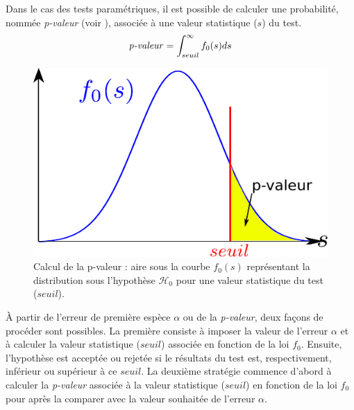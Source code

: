 Dans le cas des tests paramétriques, il est possible de calculer une probabilité, nommée \textit{p-valeur} (voir ), associée à une valeur statistique ($s$) du test.\\
\begin{equation}
    \text{\textit{p-valeur}} = \int_{seuil}^{\infty} f_0(s)ds
\end{equation}

\begin{figure}[ht]
    \centering
    \includegraphics[scale=0.6]{Images/calcul_p_valeur.pdf}
    \caption{\label{calcul_p_valeur}Calcul de la p-valeur : 
    aire sous la courbe $f_0(s)$ représentant la distribution sous l'hypothèse $\mathcal{H}_{0}$ pour une valeur statistique du test ($seuil$).}
\end{figure}

À partir de l'erreur de première espèce $\alpha$ ou de la \textit{p-valeur}, deux façons de procéder sont possibles.
La première consiste à imposer la valeur de l'erreur $\alpha$ et à calculer la valeur statistique ($seuil$) associée en fonction de la loi $f_0$.
Ensuite, l'hypothèse est acceptée ou rejetée si le résultats du test est, respectivement, inférieur ou supérieur à ce $seuil$.
La deuxième stratégie commence d'abord à calculer la \textit{p-valeur} associée à la valeur statistique ($seuil$) en fonction de la loi $f_0$
pour après la comparer avec la valeur souhaitée de l'erreur $\alpha$.\\

